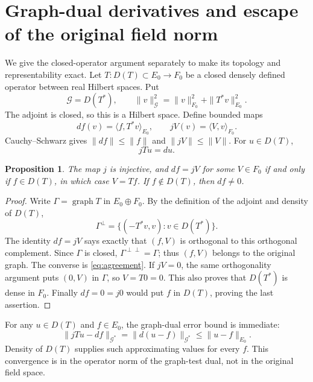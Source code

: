 \documentclass[11pt]{article}
\newtheorem{proposition}[theorem]{Proposition}
\begin{document}
\section{Graph-dual derivatives and escape of the original field norm}
We give the closed-operator argument separately to
make its topology and representability exact.
Let $T:D(T)\subset E_0\to F_0$ be a closed densely
defined operator between real Hilbert spaces. Put
\[
 \mathcal G=D(T^*),\qquad
 \|v\|_{\mathcal G}^2=\|v\|_{F_0}^2+\|T^*v\|_{E_0}^2.
\]
The adjoint is closed, so this is a Hilbert space.
Define bounded maps
\begin{equation}\label{eq:dualdefinition}
 df(v)=\langle f,T^*v\rangle_{E_0},\qquad
 jV(v)=\langle V,v\rangle_{F_0}.
\end{equation}
Cauchy--Schwarz gives $\|df\|\leq\|f\|$ and
$\|jV\|\leq\|V\|$. For $u\in D(T)$,
\begin{equation}\label{eq:agreement}
 jTu=du.
\end{equation}

\begin{proposition}\label{prop:represent}
The map $j$ is injective, and $df=jV$ for some
$V\in F_0$ if and only if $f\in D(T)$, in which
case $V=Tf$. If $f\notin D(T)$, then $df\ne0$.
\end{proposition}
\begin{proof}
Write $\Gamma=\operatorname{graph}T$ in $E_0\oplus F_0$.
By the definition of the adjoint and density of $D(T)$,
\[
 \Gamma^\perp=\{(-T^*v,v):v\in D(T^*)\}.
\]
The identity $df=jV$ says exactly that $(f,V)$ is
orthogonal to this orthogonal complement. Since
$\Gamma$ is closed, $\Gamma^{\perp\perp}=\Gamma$;
thus $(f,V)$ belongs to the original graph. The
converse is \eqref{eq:agreement}.
If $jV=0$, the same orthogonality argument puts
$(0,V)$ in $\Gamma$, so $V=T0=0$. This also proves
that $D(T^*)$ is dense in $F_0$. Finally $df=0=j0$
would put $f$ in $D(T)$, proving the last assertion.
\end{proof}

For any $u\in D(T)$ and $f\in E_0$, the graph-dual
error bound is immediate:
\begin{equation}\label{eq:error}
 \|jTu-df\|_{\mathcal G^*}
 =\|d(u-f)\|_{\mathcal G^*}\leq\|u-f\|_{E_0}.
\end{equation}
Density of $D(T)$ supplies such approximating values
for every $f$. This convergence is in the operator norm
of the graph-test dual, not in the original field space.
\end{document}
